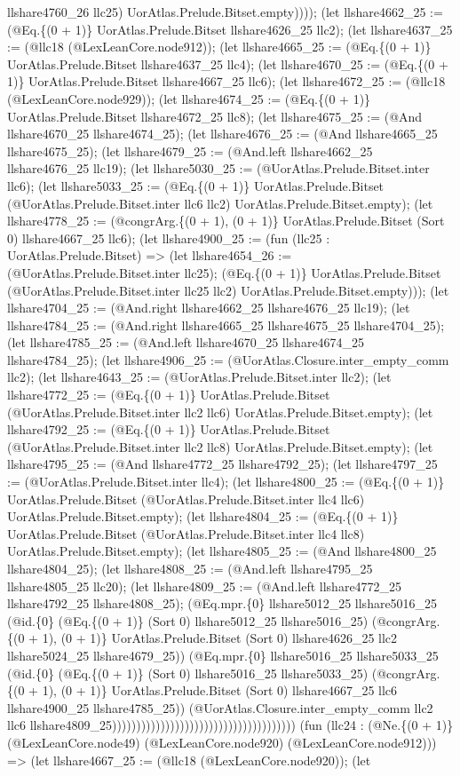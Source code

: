 \documentclass[11pt]{article}
\begin{document}
llshare4760\_26 llc25) UorAtlas.Prelude.Bitset.empty)))); (let llshare4662\_25 := (@Eq.\{(0 + 1)\} UorAtlas.Prelude.Bitset llshare4626\_25 llc2); (let llshare4637\_25 := (@llc18 (@LexLeanCore.node912)); (let llshare4665\_25 := (@Eq.\{(0 + 1)\} UorAtlas.Prelude.Bitset llshare4637\_25 llc4); (let llshare4670\_25 := (@Eq.\{(0 + 1)\} UorAtlas.Prelude.Bitset llshare4667\_25 llc6); (let llshare4672\_25 := (@llc18 (@LexLeanCore.node929)); (let llshare4674\_25 := (@Eq.\{(0 + 1)\} UorAtlas.Prelude.Bitset llshare4672\_25 llc8); (let llshare4675\_25 := (@And llshare4670\_25 llshare4674\_25); (let llshare4676\_25 := (@And llshare4665\_25 llshare4675\_25); (let llshare4679\_25 := (@And.left llshare4662\_25 llshare4676\_25 llc19); (let llshare5030\_25 := (@UorAtlas.Prelude.Bitset.inter llc6); (let llshare5033\_25 := (@Eq.\{(0 + 1)\} UorAtlas.Prelude.Bitset (@UorAtlas.Prelude.Bitset.inter llc6 llc2) UorAtlas.Prelude.Bitset.empty); (let llshare4778\_25 := (@congrArg.\{(0 + 1), (0 + 1)\} UorAtlas.Prelude.Bitset (Sort 0) llshare4667\_25 llc6); (let llshare4900\_25 := (fun (llc25 : UorAtlas.Prelude.Bitset) => (let llshare4654\_26 := (@UorAtlas.Prelude.Bitset.inter llc25); (@Eq.\{(0 + 1)\} UorAtlas.Prelude.Bitset (@UorAtlas.Prelude.Bitset.inter llc25 llc2) UorAtlas.Prelude.Bitset.empty))); (let llshare4704\_25 := (@And.right llshare4662\_25 llshare4676\_25 llc19); (let llshare4784\_25 := (@And.right llshare4665\_25 llshare4675\_25 llshare4704\_25); (let llshare4785\_25 := (@And.left llshare4670\_25 llshare4674\_25 llshare4784\_25); (let llshare4906\_25 := (@UorAtlas.Closure.inter\_empty\_comm llc2); (let llshare4643\_25 := (@UorAtlas.Prelude.Bitset.inter llc2); (let llshare4772\_25 := (@Eq.\{(0 + 1)\} UorAtlas.Prelude.Bitset (@UorAtlas.Prelude.Bitset.inter llc2 llc6) UorAtlas.Prelude.Bitset.empty); (let llshare4792\_25 := (@Eq.\{(0 + 1)\} UorAtlas.Prelude.Bitset (@UorAtlas.Prelude.Bitset.inter llc2 llc8) UorAtlas.Prelude.Bitset.empty); (let llshare4795\_25 := (@And llshare4772\_25 llshare4792\_25); (let llshare4797\_25 := (@UorAtlas.Prelude.Bitset.inter llc4); (let llshare4800\_25 := (@Eq.\{(0 + 1)\} UorAtlas.Prelude.Bitset (@UorAtlas.Prelude.Bitset.inter llc4 llc6) UorAtlas.Prelude.Bitset.empty); (let llshare4804\_25 := (@Eq.\{(0 + 1)\} UorAtlas.Prelude.Bitset (@UorAtlas.Prelude.Bitset.inter llc4 llc8) UorAtlas.Prelude.Bitset.empty); (let llshare4805\_25 := (@And llshare4800\_25 llshare4804\_25); (let llshare4808\_25 := (@And.left llshare4795\_25 llshare4805\_25 llc20); (let llshare4809\_25 := (@And.left llshare4772\_25 llshare4792\_25 llshare4808\_25); (@Eq.mpr.\{0\} llshare5012\_25 llshare5016\_25 (@id.\{0\} (@Eq.\{(0 + 1)\} (Sort 0) llshare5012\_25 llshare5016\_25) (@congrArg.\{(0 + 1), (0 + 1)\} UorAtlas.Prelude.Bitset (Sort 0) llshare4626\_25 llc2 llshare5024\_25 llshare4679\_25)) (@Eq.mpr.\{0\} llshare5016\_25 llshare5033\_25 (@id.\{0\} (@Eq.\{(0 + 1)\} (Sort 0) llshare5016\_25 llshare5033\_25) (@congrArg.\{(0 + 1), (0 + 1)\} UorAtlas.Prelude.Bitset (Sort 0) llshare4667\_25 llc6 llshare4900\_25 llshare4785\_25)) (@UorAtlas.Closure.inter\_empty\_comm llc2 llc6 llshare4809\_25)))))))))))))))))))))))))))))))))))))) (fun (llc24 : (@Ne.\{(0 + 1)\} (@LexLeanCore.node49) (@LexLeanCore.node920) (@LexLeanCore.node912))) => (let llshare4667\_25 := (@llc18 (@LexLeanCore.node920)); (let 
\end{document}
